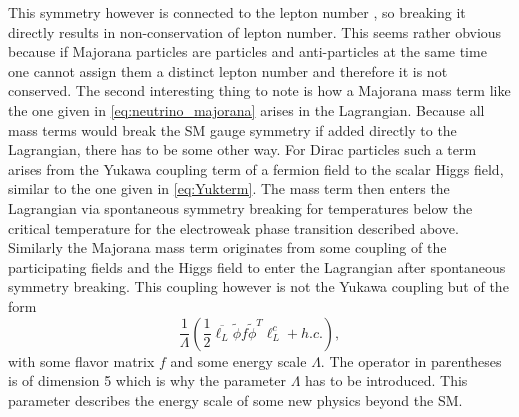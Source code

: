 This symmetry however is connected to the lepton number \cite[p. 14]{Bernreuther:2002uj}, so breaking it directly results in non-conservation of lepton number. This seems rather obvious because if Majorana particles are particles and anti-particles at the same time one cannot assign them a distinct lepton number and therefore it is not conserved. \newline \indent
The second interesting thing to note is how a Majorana mass term like the one given in \eqref{eq:neutrino_majorana} arises in the Lagrangian. Because all mass terms would break the SM gauge symmetry if added directly to the Lagrangian, there has to be some other way. For Dirac particles such a term arises from the Yukawa coupling term of a fermion field to the scalar Higgs field, similar to the one given in \eqref{eq:Yukterm}. The mass term then enters the Lagrangian via spontaneous symmetry breaking for temperatures below the critical temperature for the electroweak phase transition described above. Similarly the Majorana mass term originates from some coupling of the participating fields and the Higgs field to enter the Lagrangian after spontaneous symmetry breaking. This coupling however is not the Yukawa coupling but of the form \cite[Eq. (5)]{Drewes:2013gca}
\begin{equation}
	\frac{1}{\Lambda}\left(\frac{1}{2}\overline{\ell_L}\tilde{\phi}f\tilde{\phi}^T\ell^c_L+h.c.\right),
\end{equation}
with some flavor matrix $f$ and some energy scale $\Lambda$. The operator in parentheses is of dimension 5 which is why the parameter $\Lambda$ has to be introduced. This parameter describes the energy scale of some new physics beyond the SM.
